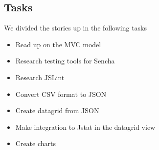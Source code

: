 \subsection{Tasks} %
\label{sub:Tasks}
We divided the stories up in the following tasks
\begin{itemize}
	\item Read up on the MVC model
	\item Research testing tools for Sencha
	\item Research JSLint
	\item Convert CSV format to JSON
	\item Create datagrid from JSON
	\item Make integration to Jstat in the datagrid view
	\item Create charts
\end{itemize}











